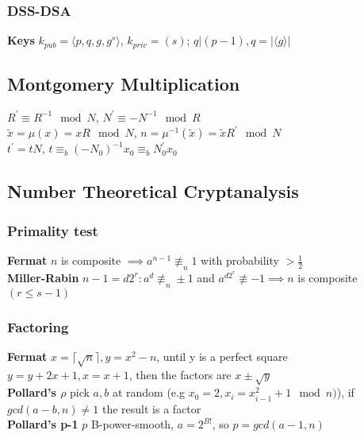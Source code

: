 \documentclass[twoside, 11pt]{article}
\begin{document}
            \subsubsection*{DSS-DSA}
                \textbf{Keys} $k_{pub} = \langle p, q, g, g^{s}\rangle$, $k_{priv} = (s)$; $q | (p-1), q = |\langle g \rangle|$     

        \subsection*{Montgomery Multiplication}
            $R^{'} \equiv R^{-1} \mod{N}$, $N^{'} \equiv -N^{-1} \mod{R}$ \\
            $\tilde{x} = \mu(x) = xR \mod{N}$, $n = \mu^{-1}(\tilde{x}) = \tilde{x}R^{'} \mod{N}$ \\
            $t^{'} = tN$, $t \equiv_{b} (-N_{0})^{-1}x_{0} \equiv_{b} N_{0}^{'}x_{0}$

        \subsection*{Number Theoretical Cryptanalysis}
            \subsubsection*{Primality test}
                \textbf{Fermat} $n$ is composite $\implies a^{n-1} \not\equiv_{n} 1$ with probability $> \frac{1}{2}$ \\ 
                \textbf{Miller-Rabin} $n-1=d2^{r}: a^{d} \not\equiv_{n} \pm 1$ and $a^{d2^{r}} \not\equiv -1 \implies n$ is composite $(r \leqslant s-1)$\\
            \subsubsection*{Factoring}
                \textbf{Fermat} $x = \lceil \sqrt{n} \rceil, y=x^{2}-n$, until y is a perfect square $y=y+2x+1, x = x+1$, then the factors are $x \pm \sqrt{y}$ \\
                \textbf{Pollard's \boldmath $\rho$} pick $a, b$ at random (e.g $x_{0}=2, x_{i}=x_{i-1}^{2} + 1 \mod{n})$), if $gcd(a-b, n) \neq 1$ the result is a factor \\
                \textbf{Pollard's p-1} $p$ B-power-smooth, $a=2^{B!}$, so $p=gcd(a-1, n)$
\end{document}
